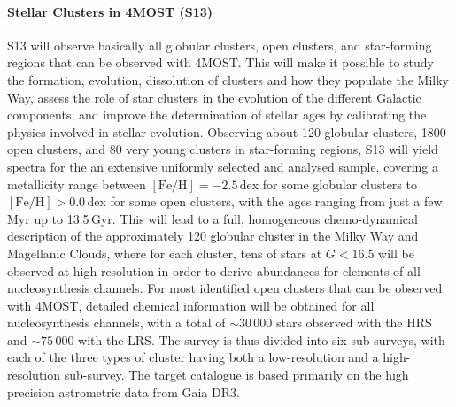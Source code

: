 \documentclass[a4paper,11pt]{article}
\begin{document}
\paragraph{Stellar Clusters in 4MOST (S13)}
S13 \citep{4mosts13} will observe basically all globular clusters, open clusters, and star-forming regions that can be observed with 4MOST. This will make it possible to study the formation, evolution, dissolution of clusters and how they populate the Milky Way, assess the role of star clusters in the evolution of the different Galactic components, and improve the determination of stellar ages by calibrating the physics involved in stellar evolution. Observing about 120 globular clusters, 1800 open clusters, and 80 very young clusters in star-forming regions, S13 will yield spectra for the an extensive uniformly selected and analysed sample, covering a metallicity range between $\mathrm{[Fe/H]}=-2.5$\,dex for some globular clusters to $\mathrm{[Fe/H]}>0.0$\,dex for some open clusters, with the ages ranging from just a few Myr up to 13.5\,Gyr. This will lead to a full, homogeneous chemo-dynamical description of the approximately 120 globular cluster in the Milky Way and Magellanic Clouds, where for each cluster, tens of stars at $G<16.5$ will be observed at high resolution in order to derive abundances for elements of all nucleosynthesis channels. For most identified open clusters that can be observed with 4MOST, detailed chemical information will be obtained for all nucleosynthesis channels, with a total of ${\sim}30\,000$ stars observed with the HRS and ${\sim}75\,000$ with the LRS. The survey is thus divided into six sub-surveys, with each of the three types of cluster having both a low-resolution and a high-resolution sub-survey. The target catalogue is based primarily on the high precision astrometric data from Gaia DR3.
%
\end{document}
